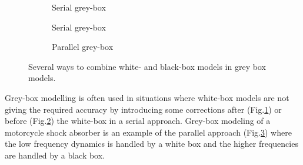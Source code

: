 \begin{figure}[H]
    \centering
    \begin{subfigure}[b]{0.3\textwidth}
    \centering
    \caption{Serial grey-box}
    \label{fig:serial1}
    \end{subfigure}

    
    \begin{subfigure}[b]{0.3\textwidth}
    \centering
    \caption{Serial grey-box}
    \label{fig:serial2}
    \end{subfigure}

    \begin{subfigure}[b]{0.3\textwidth}
    \centering
    \caption{Parallel grey-box}
    \label{fig:parallel}
    \end{subfigure}
    \caption{Several ways to combine white- and black-box models in grey box models.}
    \label{fig:greycombinations}
\end{figure}

\noindent Grey-box modelling is often used in situations where white-box models are not giving the required accuracy by introducing some corrections after (Fig.\ref{fig:serial1}) or before (Fig.\ref{fig:serial2}) the white-box in a serial approach. 
Grey-box modeling of a motorcycle shock absorber \cite{beghi_grey-box_2007} is an example of the parallel approach (Fig.\ref{fig:parallel}) where the low frequency dynamics is handled by a white box and the higher frequencies are handled by a black box.

